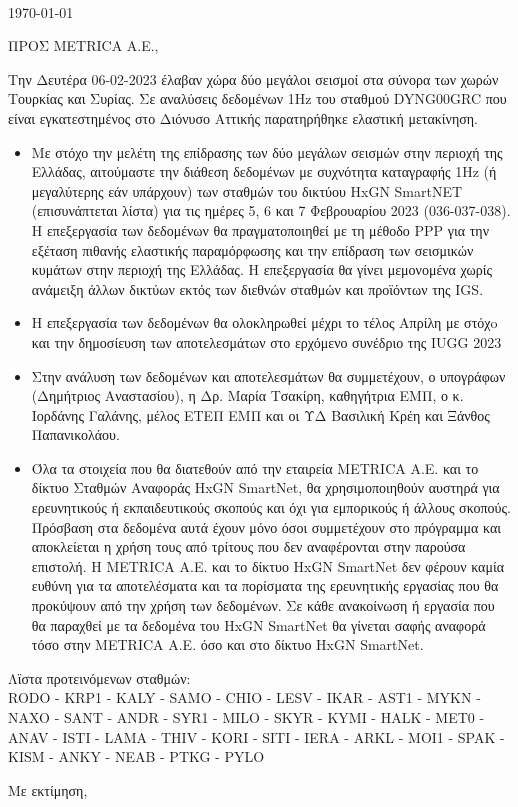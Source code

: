 \documentclass[11pt,a4paper]{letter} %
\def\opening#1{\thispagestyle{empty}
{\centering\fromaddress \vspace{1.3in} \\ %
\hspace*{\longindentation}\hfill\today\hspace*{\fill}\par} %
{\raggedright  \toaddress \par} %
\vspace{0.2in} %
\noindent #1 %
}
\begin{document}

\begin{letter}



\opening{ΠΡΟΣ METRICA Α.Ε.,}

Την Δευτέρα 06-02-2023 έλαβαν χώρα δύο μεγάλοι σεισμοί στα σύνορα των χωρών Τουρκίας και Συρίας. Σε αναλύσεις δεδομένων 1Hz του σταθμού DYNG00GRC που είναι εγκατεστημένος στο Διόνυσο Αττικής παρατηρήθηκε ελαστική μετακίνηση. 
\begin{itemize}\setlength\itemsep{.5em}
  \item Με στόχο την μελέτη της επίδρασης των δύο μεγάλων σεισμών στην περιοχή της Ελλάδας, αιτούμαστε την διάθεση δεδομένων με συχνότητα καταγραφής 1Hz (ή μεγαλύτερης εάν υπάρχουν) των σταθμών του δικτύου HxGN SmartNET (επισυνάπτεται λίστα) για τις ημέρες 5, 6 και 7 Φεβρουαρίου 2023 (036-037-038). Η επεξεργασία των δεδομένων θα πραγματοποιηθεί με τη μέθοδο PPP για την εξέταση πιθανής ελαστικής παραμόρφωσης και την επίδραση των σεισμικών κυμάτων στην περιοχή της Ελλάδας. Η επεξεργασία θα γίνει μεμονομένα χωρίς ανάμειξη άλλων δικτύων εκτός των διεθνών σταθμών και προϊόντων της IGS.
  \item Η επεξεργασία των δεδομένων θα ολοκληρωθεί μέχρι το τέλος Απρίλη με στόχo και την δημοσίευση των αποτελεσμάτων στο ερχόμενο συνέδριο της IUGG 2023
  \item Στην ανάλυση των δεδομένων και αποτελεσμάτων θα συμμετέχουν, ο υπογράφων (Δημήτριος Αναστασίου), η Δρ. Μαρία Τσακίρη, καθηγήτρια ΕΜΠ, ο κ. Ιορδάνης Γαλάνης, μέλος ΕΤΕΠ ΕΜΠ και οι ΥΔ Βασιλική Κρέη και Ξάνθος Παπανικολάου.
  \item Όλα τα στοιχεία που θα διατεθούν από την εταιρεία METRICA A.E. και το δίκτυο Σταθμών Αναφοράς HxGN SmartNet, θα χρησιμοποιηθούν αυστηρά για ερευνητικούς ή εκπαιδευτικούς σκοπούς και όχι για εμπορικούς ή άλλους σκοπούς. Πρόσβαση στα δεδομένα αυτά έχουν μόνο όσοι συμμετέχουν στο πρόγραμμα και αποκλείεται η χρήση τους από τρίτους που δεν αναφέρονται στην παρούσα επιστολή. Η METRICA A.E. και το δίκτυο HxGN SmartNet δεν φέρουν καμία ευθύνη για τα αποτελέσματα και τα πορίσματα της ερευνητικής εργασίας που θα προκύψουν από την χρήση των δεδομένων. Σε κάθε ανακοίνωση ή εργασία που θα παραχθεί με τα δεδομένα του HxGN SmartNet θα γίνεται σαφής αναφορά τόσο στην METRICA A.E. όσο και στο δίκτυο HxGN SmartNet.
\end{itemize}
Λϊστα προτεινόμενων σταθμών: \\
RODO - KRP1 - KALY - SAMO - CHIO - LESV - IKAR - AST1 - MYKN - NAXO - SANT - ANDR - SYR1 - MILO - SKYR - KYMI - HALK - MET0 - ANAV - ISTI - LAMA - THIV - KORI -  SITI - IERA - ARKL - MOI1 - SPAK - KISM - ANKY - NEAB - PTKG - PYLO
\vskip-1cm
\closing{Με εκτίμηση,}


\end{letter}
\end{document}
